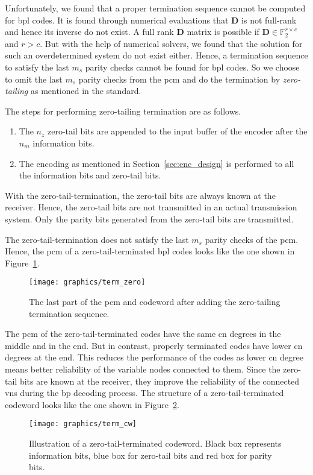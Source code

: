 Unfortunately, we found that a proper termination sequence cannot be computed for \ac{bpl} codes. It is found through numerical evaluations that $\mathbf{D}$ is not full-rank and hence its inverse do not exist. A full rank $\mathbf{D}$ matrix is possible if $\mathbf{D}\in\mathbb{F}_2^{r\times c}$ and $r>c$. But with the help of numerical solvers, we found that the solution for such an overdetermined system do not exist either. Hence, a termination sequence to satisfy the last $m_s$ parity checks cannot be found for \ac{bpl} codes. So we choose to omit the last $m_s$ parity checks from the \ac{pcm} and do the termination by \emph{zero-tailing} as mentioned in the standard.

The steps for performing zero-tailing termination are as follows.
\begin{enumerate}
  \item The $n_z$ zero-tail bits are appended to the input buffer of the encoder after the $n_m$ information bits.
  \item The encoding as mentioned in Section~\ref{sec:enc_design} is performed to all the information bits and zero-tail bits.
\end{enumerate}
With the zero-tail-termination, the zero-tail bits are always known at the receiver. Hence, the zero-tail bits are not transmitted in an actual transmission system. Only the parity bits generated from the zero-tail bits are transmitted.

The zero-tail-termination does not satisfy the last $m_s$ parity checks of the \ac{pcm}. Hence, the \ac{pcm} of a zero-tail-terminated \ac{bpl} codes looks like the one shown in Figure~\ref{fig:pcm_zero}.
\begin{figure}[htbp]
  \centering
  \texttt{[image: graphics/term\_zero]}
  \caption{The last part of the \ac{pcm} and codeword after adding the zero-tailing termination sequence.}
  \label{fig:pcm_zero}
\end{figure}

The \ac{pcm} of the zero-tail-terminated codes have the same \ac{cn} degrees in the middle and in the end. But in contrast, properly terminated codes have lower \ac{cn} degrees at the end. This reduces the performance of the codes as lower \ac{cn} degree means better reliability of the variable nodes connected to them. Since the zero-tail bits are known at the receiver, they improve the reliability of the connected \acp{vn} during the \ac{bp} decoding process. The structure of a zero-tail-terminated codeword looks like the one shown in Figure~\ref{fig:term_cw}.

\begin{figure}[htbp]
  \centering
  \texttt{[image: graphics/term\_cw]}
  \caption{Illustration of a zero-tail-terminated codeword. Black box represents information bits, blue box for zero-tail bits and red box for parity bits.}
  \label{fig:term_cw}
\end{figure}